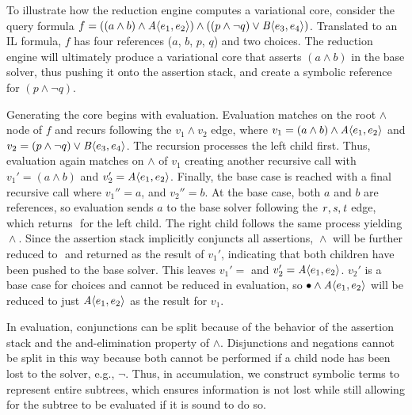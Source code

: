 To illustrate how the reduction engine computes a variational core, consider the
query formula $f = ((a \wedge b) \wedge \chc[A]{e_{1}, e_{2}}) \wedge ((p \wedge
\neg q) \vee \chc[B]{e_{3}, e_{4}})$. Translated to an IL formula, $f$ has four
references ($a$, $b$, $p$, $q$) and two choices. The reduction engine will
ultimately produce a variational core that asserts $(a \wedge b)$ in the base
solver, thus pushing it onto the assertion stack, and create a symbolic
reference for $(p \wedge \neg q)$.

Generating the core begins with evaluation. Evaluation matches on the root
$\wedge$ node of $f$ and recurs following the $v_1 \wedge v_2$ edge, where
%
$v_1=(a\wedge b)\wedge\chc[A]{e_1,e_2}$ and
$v_2=(p\wedge \neg q) \vee \chc[B]{e_3, e_4}$.
%
The recursion processes the left child first. Thus, evaluation again matches on
$\wedge$ of $v_{1}$ creating another recursive call with $v_{1}' = (a\wedge b)$
and $v_{2}' = \chc[A]{e_1,e_2}$. Finally, the base case is reached with a final
recursive call where $v_{1}'' = a$, and $v_{2}'' = b$. At the base case, both
$a$ and $b$ are references, so evaluation sends $a$ to the base solver
following the $\mathit{r, s, t}$ edge, which returns $\unit{}$ for the left child.
The right child follows the same process yielding $\unit{} \wedge \unit{}$.
Since the assertion stack implicitly conjuncts all assertions, $\unit{} \wedge
\unit{}$ will be further reduced to $\unit{}$ and returned as the result of
$v_{1}'$, indicating that both children have been pushed to the base solver.
This leaves $v_{1}' = \unit{}$ and $v_{2}' = \chc[A]{e_1,e_2}$. $v_{2}'$ is a
base case for choices and cannot be reduced in evaluation, so $\unit{} \wedge
\chc[A]{e_1,e_2}$ will be reduced to just $\chc[A]{e_1,e_2}$ as the result for
$v_{1}$.

In evaluation, conjunctions can be split because of the behavior of the
assertion stack and the and-elimination property of $\wedge$. Disjunctions and
negations cannot be split in this way because both cannot be performed if a
child node has been lost to the solver, e.g., $\neg \unit{}$. Thus, in
accumulation, we construct symbolic terms to represent entire subtrees, which
ensures information is not lost while still allowing for the subtree to be
evaluated if it is sound to do so.

